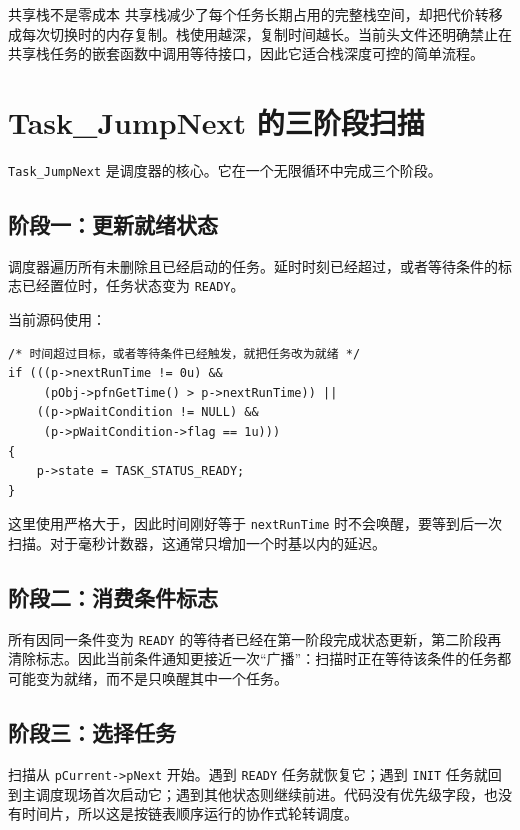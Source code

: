 \begin{anybox}{共享栈不是零成本}
共享栈减少了每个任务长期占用的完整栈空间，却把代价转移成每次切换时的内存复制。栈使用越深，复制时间越长。当前头文件还明确禁止在共享栈任务的嵌套函数中调用等待接口，因此它适合栈深度可控的简单流程。
\end{anybox}

\section{Task\_JumpNext 的三阶段扫描}

\texttt{Task\_JumpNext} 是调度器的核心。它在一个无限循环中完成三个阶段。

\subsection{阶段一：更新就绪状态}

调度器遍历所有未删除且已经启动的任务。延时时刻已经超过，或者等待条件的标志已经置位时，任务状态变为 \texttt{READY}。

当前源码使用：

\begin{lstlisting}[style=c]
/* 时间超过目标，或者等待条件已经触发，就把任务改为就绪 */
if (((p->nextRunTime != 0u) &&
     (pObj->pfnGetTime() > p->nextRunTime)) ||
    ((p->pWaitCondition != NULL) &&
     (p->pWaitCondition->flag == 1u)))
{
    p->state = TASK_STATUS_READY;
}
\end{lstlisting}

这里使用严格大于，因此时间刚好等于 \texttt{nextRunTime} 时不会唤醒，要等到后一次扫描。对于毫秒计数器，这通常只增加一个时基以内的延迟。

\subsection{阶段二：消费条件标志}

所有因同一条件变为 \texttt{READY} 的等待者已经在第一阶段完成状态更新，第二阶段再清除标志。因此当前条件通知更接近一次“广播”：扫描时正在等待该条件的任务都可能变为就绪，而不是只唤醒其中一个任务。

\subsection{阶段三：选择任务}

扫描从 \texttt{pCurrent->pNext} 开始。遇到 \texttt{READY} 任务就恢复它；遇到 \texttt{INIT} 任务就回到主调度现场首次启动它；遇到其他状态则继续前进。代码没有优先级字段，也没有时间片，所以这是按链表顺序运行的协作式轮转调度。

